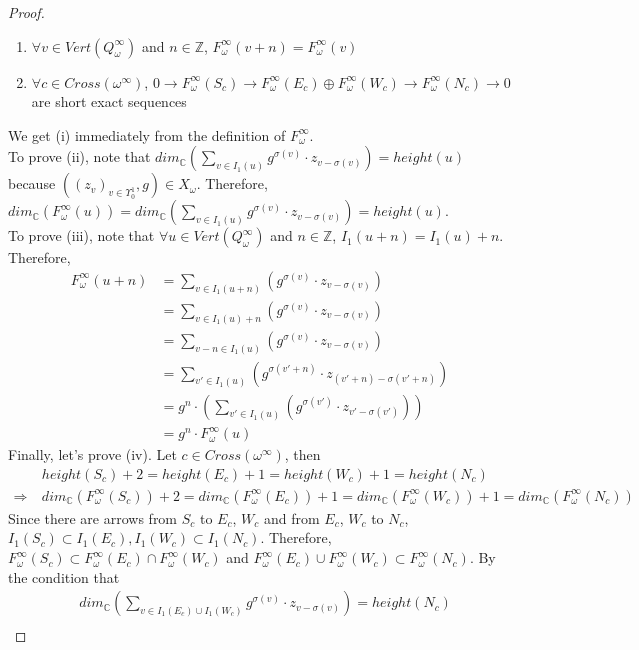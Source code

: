 \begin{proof}
\begin{enumerate}[label = (\roman*)]
\item $\forall v\in Vert(Q_\omega^\infty)$ and $n\in \mathbb{Z}$, $F_\omega^\infty(v+n) = F_\omega^\infty(v)$
\item $\forall c\in Cross(\omega^\infty)$, $0\rightarrow F_\omega^\infty(S_c)\rightarrow F_\omega^\infty(E_c)\oplus F_\omega^\infty(W_c)\rightarrow F_\omega^\infty(N_c)\rightarrow 0$ are short exact sequences
\end{enumerate}
We get (\Rn{1}) immediately from the definition of $F_\omega^\infty$.\\
To prove (\Rn{2}), note that $dim_\mathbb{C}(\sum_{v\in I_1(u)} g^{\sigma(v)}\cdot z_{v-\sigma(v)})=height(u)$ because $((z_v)_{v\in \Upsilon_0^1},g)\in X_\omega$. Therefore, $dim_\mathbb{C}(F_\omega^\infty(u)) = dim_\mathbb{C}(\sum_{v\in I_1(u)} g^{\sigma(v)}\cdot z_{v-\sigma(v)})=height(u)$.\\
To prove (\Rn{3}), note that $\forall u\in Vert(Q_\omega^\infty)$ and $n\in \mathbb{Z}$, $I_1(u+n) = I_1(u) + n$. Therefore, 
\begin{align*}
	F_\omega^\infty(u+n) &= \sum_{v \in I_1(u+n)} (g^{\sigma(v)}\cdot z_{v - \sigma(v)})\\
	&= \sum_{v \in I_1(u)+n} (g^{\sigma(v)}\cdot z_{v - \sigma(v)})\\
	&= \sum_{v-n \in I_1(u)} (g^{\sigma(v)}\cdot z_{v - \sigma(v)})\\
	&= \sum_{v' \in I_1(u)} (g^{\sigma(v'+n)}\cdot z_{(v'+n) - \sigma(v'+n)})\\
	&= g^n \cdot (\sum_{v' \in I_1(u)} (g^{\sigma(v')}\cdot z_{v' - \sigma(v')}))\\
	&= g^n \cdot F_\omega^\infty(u)
\end{align*}
Finally, let's prove (\Rn{4}). Let $c\in Cross(\omega^\infty)$, then
\begin{align*}
&height(S_c) + 2 = height(E_c)+1 = height(W_c)+1 = height(N_c)\\
\Rightarrow~& dim_\mathbb{C}(F_\omega^\infty(S_c)) + 2 = dim_\mathbb{C}(F_\omega^\infty(E_c))+1 = dim_\mathbb{C}(F_\omega^\infty(W_c))+1 = dim_\mathbb{C}(F_\omega^\infty(N_c))
\end{align*}
Since there are arrows from $S_c$ to $E_c$, $W_c$ and from $E_c$, $W_c$ to $N_c$, $I_1(S_c)\subset I_1(E_c),I_1(W_c)\subset I_1(N_c)$. Therefore, $F_\omega^\infty(S_c)\subset F_\omega^\infty(E_c)\cap F_\omega^\infty(W_c)$ and $F_\omega^\infty(E_c)\cup F_\omega^\infty(W_c)\subset F_\omega^\infty(N_c)$. By the condition that 
\begin{align*}
&dim_\mathbb{C}(\sum_{v\in I_1(E_c)\cup I_1(W_c)}g^{\sigma(v)}\cdot z_{v-\sigma(v)}) = height(N_c)\\

\end{align*}
\end{proof}
